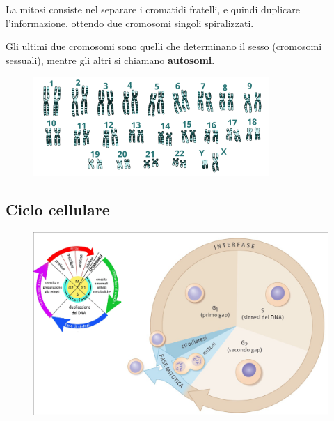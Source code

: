 \documentclass[a4paper]{article}
\begin{document}

La mitosi consiste nel separare i cromatidi fratelli, e quindi duplicare l'informazione,
ottendo due cromosomi singoli spiralizzati.


Gli ultimi due cromosomi sono quelli che determinano il sesso (cromosomi sessuali),
mentre gli altri si chiamano \textbf{autosomi}.

\begin{center}
\begin{figure}[ht]
    \centering
    \includegraphics[width=0.8\textwidth]{./cariotipo}
\end{figure}
\end{center}

\subsection{Ciclo cellulare}

\vspace{0.1cm}

\begin{center}
\begin{figure}[ht]
    \centering
    \includegraphics[width=\textwidth]{./ciclo_cellulare}
\end{figure}
\end{center}
\end{document}

